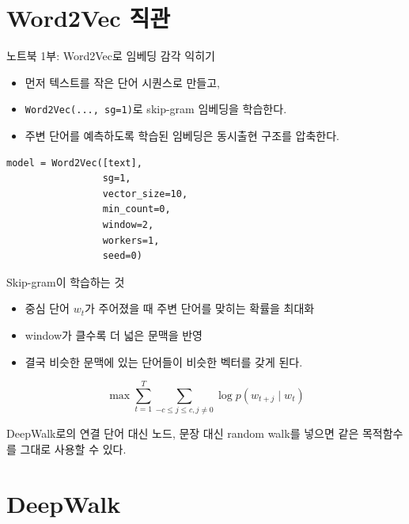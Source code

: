 \section{Word2Vec 직관}

\begin{frame}[fragile]{노트북 1부: Word2Vec로 임베딩 감각 익히기}
\begin{itemize}
  \item 먼저 텍스트를 작은 단어 시퀀스로 만들고,
  \item \texttt{Word2Vec(..., sg=1)}로 skip-gram 임베딩을 학습한다.
  \item 주변 단어를 예측하도록 학습된 임베딩은 동시출현 구조를 압축한다.
\end{itemize}
\vspace{0.5em}
\begin{lstlisting}
model = Word2Vec([text],
                 sg=1,
                 vector_size=10,
                 min_count=0,
                 window=2,
                 workers=1,
                 seed=0)
\end{lstlisting}
\end{frame}

\begin{frame}{Skip-gram이 학습하는 것}
\small
\begin{itemize}
  \item 중심 단어 $w_t$가 주어졌을 때 주변 단어를 맞히는 확률을 최대화
  \item window가 클수록 더 넓은 문맥을 반영
  \item 결국 비슷한 문맥에 있는 단어들이 비슷한 벡터를 갖게 된다.
\end{itemize}
\vspace{0.4em}
\[
\max \sum_{t=1}^{T}\sum_{-c \le j \le c, j \neq 0}
\log p(w_{t+j}\mid w_t)
\]
\vspace{0.2em}
\begin{block}{DeepWalk로의 연결}
단어 대신 노드, 문장 대신 random walk를 넣으면 같은 목적함수를 그대로 사용할 수 있다.
\end{block}
\end{frame}

\section{DeepWalk}

